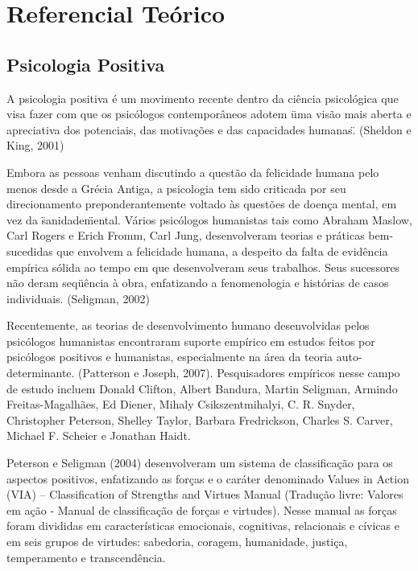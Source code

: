 \part{Referencial Teórico}

\chapter{Psicologia Positiva}

A psicologia positiva é um movimento recente dentro da ciência psicológica que visa fazer com que os psicólogos contemporâneos adotem \"uma visão mais aberta e apreciativa dos potenciais, das motivações e das capacidades humanas\". (Sheldon e King, 2001)

Embora as pessoas venham discutindo a questão da felicidade humana pelo menos desde a Grécia Antiga, a psicologia tem sido criticada por seu direcionamento preponderantemente voltado às questões de doença mental, em vez da \"sanidade\" mental. Vários psicólogos humanistas tais como Abraham Maslow, Carl Rogers e Erich Fromm, Carl Jung, desenvolveram teorias e práticas bem-sucedidas que envolvem a felicidade humana, a despeito da falta de evidência empírica sólida ao tempo em que desenvolveram seus trabalhos. Seus sucessores não deram seqüência à obra, enfatizando a fenomenologia e histórias de casos individuais. (Seligman, 2002)

Recentemente, as teorias de desenvolvimento humano desenvolvidas pelos psicólogos humanistas encontraram suporte empírico em estudos feitos por psicólogos positivos e humanistas, especialmente na área da teoria auto-determinante. (Patterson e Joseph, 2007). Pesquisadores empíricos nesse campo de estudo incluem Donald Clifton, Albert Bandura, Martin Seligman, Armindo Freitas-Magalhães, Ed Diener, Mihaly Csikszentmihalyi, C. R. Snyder, Christopher Peterson, Shelley Taylor, Barbara Fredrickson, Charles S. Carver, Michael F. Scheier e Jonathan Haidt.

Peterson e Seligman (2004) desenvolveram um sistema de classificação para os aspectos positivos, enfatizando as forças e o caráter denominado Values in Action (VIA) – Classification of Strengths and Virtues Manual (Tradução livre: Valores em ação - Manual de classificação de forças e virtudes). Nesse manual as forças foram divididas em características emocionais, cognitivas, relacionais e cívicas e em seis grupos de virtudes: sabedoria, coragem, humanidade, justiça, temperamento e transcendência.

